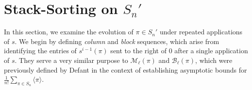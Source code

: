 \documentclass[12pt]{amsart}
\DeclareMathOperator{\upof}{up}
\newcommand{\met}[1]{\langle #1\rangle}
\theoremstyle{definition}
\newtheorem{theorem}{Theorem}[section]
\newtheorem{lemma}[theorem]{Lemma}
\newtheorem{corollary}[theorem]{Corollary}
\begin{document}

\section{Stack-Sorting on $S_n'$}\label{sec:3}
In this section, we examine the evolution of $\pi\in S_n'$ under repeated applications of $s$. We begin by defining \emph{column} and \emph{block} sequences, which arise from identifying the entries of $s^{i-1}(\pi)$ sent to the right of $0$ after a single application of $s$. They serve a very similar purpose to $\mathcal{M}_{\ell}(\pi)$ and $\mathcal{B}_{\ell}(\pi)$, which were previously defined by Defant\cite{defant2} in the context of establishing asymptotic bounds for $\frac{1}{n!}\sum_{\pi\in S_n}\met{\pi}$.
\end{document}

